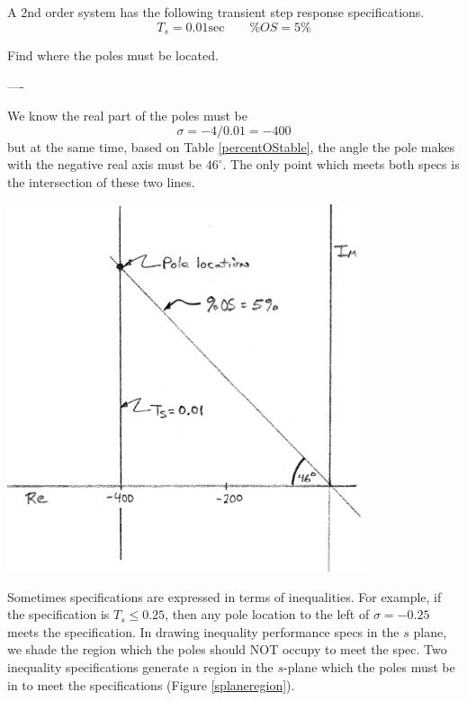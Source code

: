 \begin{ExampleSmall}
A 2nd order system has the following transient step response specifications.
\[
T_s = 0.01 \mathrm{sec} \qquad \%OS = 5\%
\]

Find where the poles must be located.

\vspace{0.1in}
----

We know the real part of the poles  must be
\[
\sigma = -4/0.01 = -400
\]
but at the same time, based on Table \ref{percentOStable}, the angle the pole makes with the negative real axis must be $46^\circ$.  The only point which meets both specs is the intersection of these two lines.

\includegraphics[width=105mm]{figs09/00787a.png}

\end{ExampleSmall}



Sometimes specifications are expressed in terms of inequalities.  For example, if the specification is $T_s \leq 0.25$, then any pole location to the left of $\sigma  = -0.25$ meets the specification.  In drawing inequality performance specs in the $s$ plane, we shade the region which the poles should NOT occupy to meet the spec.   Two inequality specifications generate a region in the $s$-plane which the poles must be in to meet the specifications (Figure \ref{splaneregion}).


